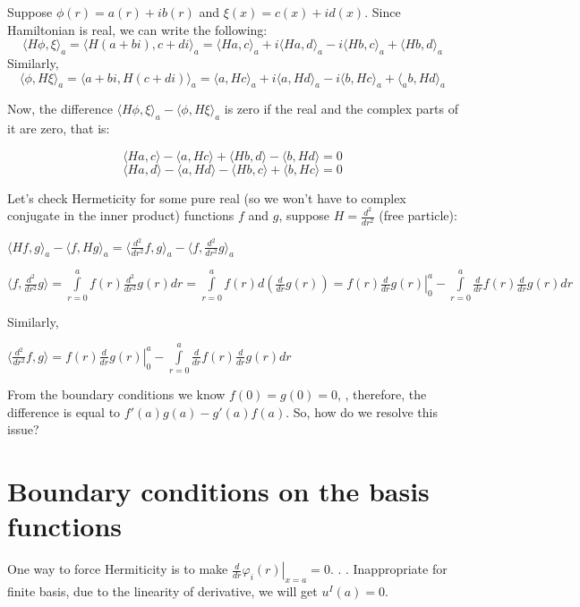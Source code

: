 \documentclass[12pt, a4paper]{article}
\begin{document}
Suppose $\phi(r) = a(r) + i b(r)$ and $\xi(x) = c(x) + i d(x)$.
Since Hamiltonian is real, we can write the following:
$$\langle H \phi, \xi \rangle_a = \langle H(a + bi), c + di \rangle_a = \langle Ha, c \rangle_a + i \langle Ha, d \rangle_a - i \langle Hb, c \rangle_a + \langle Hb, d \rangle_a$$
Similarly,
$$\langle \phi, H \xi \rangle_a = \langle a + bi, H(c + di) \rangle_a = \langle a, Hc \rangle_a + i \langle a, Hd \rangle_a - i \langle b, Hc \rangle_a + \langle_a b, Hd \rangle_a$$

Now, the difference $\langle H \phi, \xi \rangle_a - \langle \phi, H \xi \rangle_a$ is zero if the real and the complex parts of it are zero, that is:

$$\langle Ha, c \rangle - \langle a, Hc \rangle + \langle Hb, d \rangle - \langle b, Hd \rangle = 0$$
$$\langle Ha, d \rangle - \langle a, Hd \rangle - \langle Hb, c \rangle + \langle b, Hc \rangle = 0$$


Let's check Hermeticity for some pure real (so we won't have to complex conjugate in the inner product) functions $f$ and $g$, suppose $H = \frac{d^2}{dr^2}$ (free particle):

$\langle Hf, g \rangle_a - \langle f, H g \rangle_a = \langle \frac{d^2}{d r^2} f, g \rangle_a - \langle f, \frac{d^2}{d r^2} g \rangle_a$

$\langle f, \frac{d^2}{d r^2} g \rangle = \int\limits_{r = 0}^a f(r) \frac{d^2}{d r^2} g(r) dr = \int\limits_{r = 0}^a f(r) d \left(\frac{d}{d r} g(r) \right) = \left. f(r) \frac{d}{d r} g(r) \right|_0^a - \int\limits_{r = 0}^a \frac{d}{d r} f(r) \frac{d}{d r} g(r) dr$

Similarly,

$\langle \frac{d^2}{d r^2} f, g \rangle = \left. f(r) \frac{d}{d r} g(r) \right|_0^a - \int\limits_{r = 0}^a \frac{d}{d r} f(r) \frac{d}{d r} g(r) dr$

From the boundary conditions we know $f(0) = g(0) = 0$, , therefore, the difference  is equal to $f'(a) g(a) - g'(a) f(a)$. So, how do we resolve this issue?

\section{Boundary conditions on the basis functions}
One way to force Hermiticity is to make $\left. \frac{d}{dr} \varphi_i(r) \right|_{x = a} = 0$. . . Inappropriate for finite basis, due to the linearity of derivative, we will get $u^I(a) = 0$.
\end{document}
